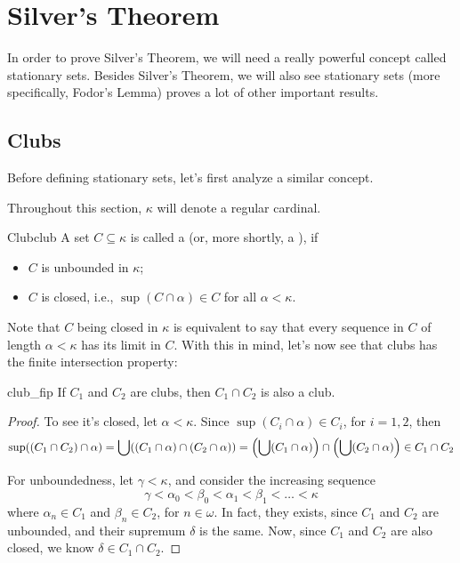\chapter{Silver's Theorem}

In order to prove Silver's Theorem, we will need a really powerful concept called stationary sets. Besides Silver's Theorem, we will also see stationary sets (more specifically, Fodor's Lemma) proves a lot of other important results.

\section{Clubs}

Before defining stationary sets, let's first analyze a similar concept.

Throughout this section, $\kappa$ will denote a regular cardinal.

\begin{definition}{Club}{club}
    A set $C\subseteq\kappa$ is called a  (or, more shortly, a ), if
    \begin{itemize}
        \item $C$ is unbounded in $\kappa$;
        \item $C$ is closed, i.e., $\sup(C\cap\alpha)\in C$ for all $\alpha<\kappa$.
    \end{itemize}
\end{definition}

Note that $C$ being closed in $\kappa$ is equivalent to say that every sequence in $C$ of length $\alpha<\kappa$ has its limit in $C$. With this in mind, let's now see that clubs has the finite intersection property:

\begin{lemma}{}{club_fip}
    If $C_1$ and $C_2$ are clubs, then $C_1\cap C_2$ is also a club.
\end{lemma}

\begin{proof}
    To see it's closed, let $\alpha<\kappa$. Since $\sup(C_i\cap\alpha)\in C_i$, for $i=1,2$, then
    $$\sup((C_1\cap C_2)\cap\alpha)=\bigcup((C_1\cap\alpha)\cap(C_2\cap\alpha))={\left(\bigcup(C_1\cap\alpha)\right)}\cap{\left(\bigcup(C_2\cap\alpha)\right)}\in C_1\cap C_2$$

    For unboundedness, let $\gamma<\kappa$, and consider the increasing sequence
    $$\gamma<\alpha_0<\beta_0<\alpha_1<\beta_1<\dots<\kappa$$
    where $\alpha_n\in C_1$ and $\beta_n\in C_2$, for $n\in\omega$. In fact, they exists, since $C_1$ and $C_2$ are unbounded, and their supremum $\delta$ is the same. Now, since $C_1$ and $C_2$ are also closed, we know $\delta\in C_1\cap C_2$.
\end{proof}

